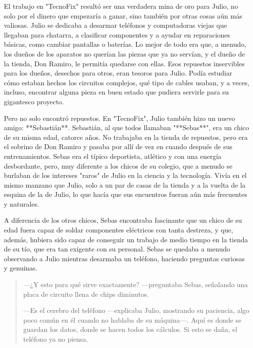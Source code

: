\documentclass[a4paper,12pt]{book}
\begin{document}
El trabajo en "TecnoFix" resultó ser una verdadera mina de oro para Julio, no solo por el dinero que empezaría a ganar, sino también por otras cosas aún más valiosas. Julio se dedicaba a desarmar teléfonos y computadoras viejas que llegaban para chatarra, a clasificar componentes y a ayudar en reparaciones básicas, como cambiar pantallas o baterías. Lo mejor de todo era que, a menudo, los dueños de los aparatos no querían las piezas que ya no servían, y el dueño de la tienda, Don Ramiro, le permitía quedarse con ellas. Esos repuestos inservibles para los dueños, desechos para otros, eran tesoros para Julio. Podía estudiar cómo estaban hechos los circuitos complejos, qué tipo de cables usaban, y a veces, incluso, encontrar alguna pieza en buen estado que pudiera servirle para su gigantesco proyecto.

Pero no solo encontró repuestos. En "TecnoFix", Julio también hizo un nuevo amigo: **Sebastián**. Sebastián, al que todos llamaban "**Sebas**", era un chico de su misma edad, catorce años. No trabajaba en la tienda de repuestos, pero era el sobrino de Don Ramiro y pasaba por allí de vez en cuando después de sus entrenamientos. Sebas era el típico deportista, atlético y con una energía desbordante, pero, muy diferente a los chicos de su colegio, que a menudo se burlaban de los intereses "raros" de Julio en la ciencia y la tecnología. Vivía en el mismo manzano que Julio, solo a un par de casas de la tienda y a la vuelta de la esquina de la de Julio, lo que hacía que sus encuentros fueran aún más frecuentes y naturales.

A diferencia de los otros chicos, Sebas encontraba fascinante que un chico de su edad fuera capaz de soldar componentes eléctricos con tanta destreza, y que, además, hubiera sido capaz de conseguir un trabajo de medio tiempo en la tienda de su tío, que era tan exigente con su personal. Sebas se quedaba a menudo observando a Julio mientras desarmaba un teléfono, haciendo preguntas curiosas y genuinas.

\begin{quote}
    —¿Y esto para qué sirve exactamente? —preguntaba Sebas, señalando una placa de circuito llena de chips diminutos.

    —Es el cerebro del teléfono —explicaba Julio, mostrando su paciencia, algo poco común en él cuando no hablaba de su máquina—. Aquí es donde se guardan los datos, donde se hacen todos los cálculos. Si esto se daña, el teléfono ya no piensa.
\end{quote}
\end{document}
